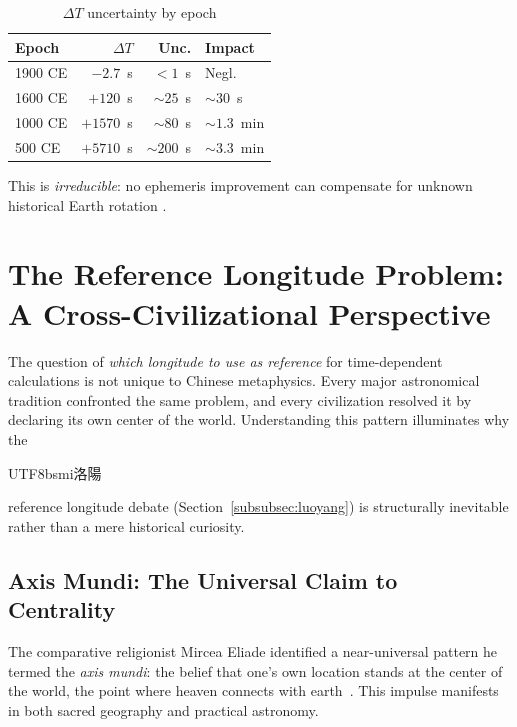 \documentclass[10pt,a4paper]{article}
\newcommand{\zh}[1]{\begin{CJK}{UTF8}{bsmi}#1\end{CJK}}
\begin{document}
\begin{table}[H]
\centering
\caption{$\Delta T$ uncertainty by epoch}
\label{tab:deltaT}
\footnotesize
\begin{tabular}{lrrl}
\toprule
\textbf{Epoch} & $\Delta T$ & \textbf{Unc.} & \textbf{Impact} \\
\midrule
1900 CE & $-2.7$~s & $<1$~s & Negl. \\
1600 CE & $+120$~s & $\sim 25$~s & $\sim 30$~s \\
1000 CE & $+1570$~s & $\sim 80$~s & $\sim 1.3$~min \\
500 CE & $+5710$~s & $\sim 200$~s & $\sim 3.3$~min \\
\bottomrule
\end{tabular}
\end{table}

This is \emph{irreducible}: no ephemeris improvement can compensate for
unknown historical Earth rotation \cite{stephenson2016}.


\section{The Reference Longitude Problem: A Cross-Civilizational Perspective}
\label{sec:meridians}

The question of \emph{which longitude to use as reference} for time-dependent
calculations is not unique to Chinese metaphysics. Every major astronomical
tradition confronted the same problem, and every civilization resolved it by
declaring its own center of the world. Understanding this pattern illuminates
why the \zh{洛陽} reference longitude debate (Section~\ref{subsubsec:luoyang})
is structurally inevitable rather than a mere historical curiosity.

\subsection{Axis Mundi: The Universal Claim to Centrality}
\label{subsec:axismundi}

The comparative religionist Mircea Eliade identified a near-universal pattern
he termed the \textit{axis mundi}: the belief that one's own location stands
at the center of the world, the point where heaven connects with
earth~\cite{eliade1958}. This impulse manifests in both sacred geography
and practical astronomy.
\end{document}
